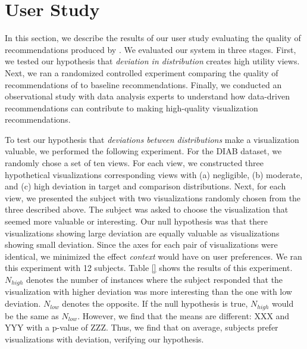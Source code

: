 
\section{User Study}
\label{sec:user_study}

In this section, we describe the results of our user study evaluating the quality of recommendations produced by \SeeDB.
We evaluated our system in three stages. 
First, we tested our hypothesis that {\it deviation in distribution} creates high utility views.
Next, we ran a randomized controlled experiment 
comparing the quality of recommendations of \SeeDB to baseline
recommendations.
Finally, we conducted an observational study with data analysis experts 
to understand how data-driven recommendations can contribute to
making high-quality visualization recommendations.

To test our hypothesis that {\it deviations between distributions} make a visualization valuable, we performed the following experiment.
For the DIAB dataset, we randomly chose a set of ten views.
For each view, we constructed three hypothetical visualizations corresponding views with (a) negligible, (b) moderate, and (c) high deviation in target and comparison distributions.
Next, for each view, we presented the subject with two visualizations randomly chosen from the three described above.
The subject was asked to choose the visualization that seemed more
valuable or interesting.
Our null hypothesis was that there visualizations showing large deviation are equally valuable as visualizations showing small deviation. 
Since the axes for each pair of visualizations were identical, we minimized the effect {\it context} would have on user preferences.
We ran this experiment with 12 subjects.
Table \ref{} shows the results of this experiment.
$N_{high}$ denotes the number of instances where the subject responded that the visualization with higher deviation was more interesting than the one with low deviation. 
$N_{low}$ denotes the opposite.
If the null hypothesis is true, $N_{high}$ would be the same as $N_{low}$.
However, we find that the means are different: XXX and YYY with a p-value of ZZZ.
Thus, we find that on average, subjects prefer visualizations with deviation, verifying our hypothesis.

